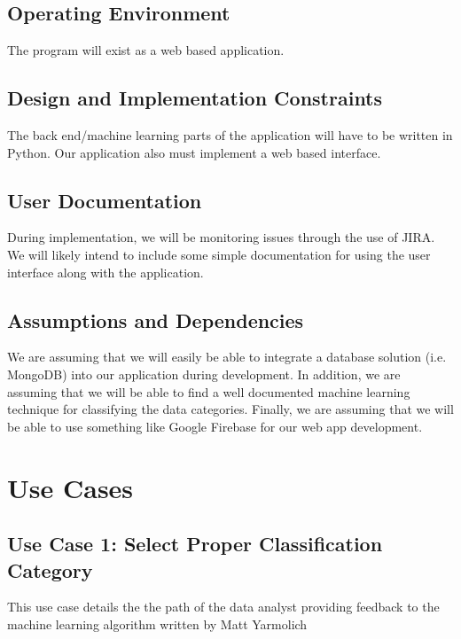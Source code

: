 \documentclass[12pt,oneside,letterpaper]{article}
\begin{document}
\subsection{Operating Environment}
The program will exist as a web based application.
\subsection{Design and Implementation Constraints}
The back end/machine learning parts of the application will have to be written in Python. Our application also must implement a web based interface.
\subsection{User Documentation}
During implementation, we will be monitoring issues through the use of JIRA. We will likely intend to include some simple documentation for using the user interface along with the application. 
\subsection{Assumptions and Dependencies}
We are assuming that we will easily be able to integrate a database solution (i.e. MongoDB) into our application during development. In addition, we are assuming that we will be able to find a well documented machine learning technique for classifying the data categories. Finally, we are assuming that we will be able to use something like Google Firebase for our web app development.


\section{Use Cases}

\subsection{\label{Selecting the Proper Classification from the UIl}Use Case 1: Select Proper Classification Category}
This use case details the the path of the data analyst providing feedback to the machine learning algorithm written by Matt Yarmolich
\end{document}
